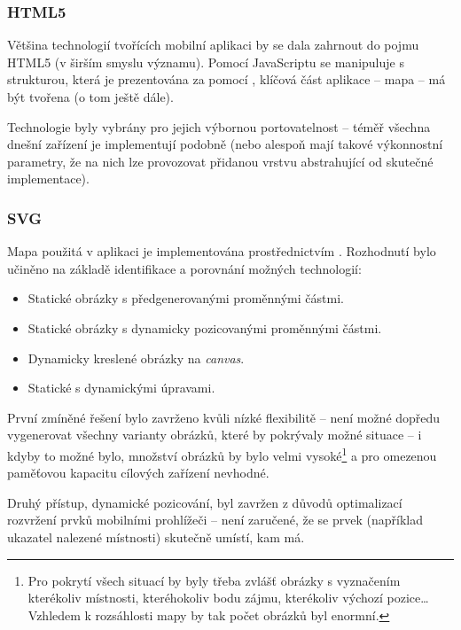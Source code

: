 \subsubsection{HTML5}
Většina technologií tvořících mobilní aplikaci by se dala zahrnout do pojmu HTML5 (v širším smyslu významu). Pomocí JavaScriptu se manipuluje s  strukturou, která je prezentována za pomocí , klíčová část aplikace -- mapa -- má být tvořena  (o tom ještě dále).

Technologie byly vybrány pro jejich výbornou portovatelnost -- téměř všechna dnešní zařízení je implementují podobně (nebo alespoň mají takové výkonnostní parametry, že na nich lze provozovat přidanou vrstvu abstrahující od skutečné implementace).

\subsubsection{SVG}
Mapa použitá v aplikaci je implementována prostřednictvím . Rozhodnutí bylo učiněno na základě identifikace a porovnání možných technologií:
\begin{itemize}
 \item Statické obrázky s předgenerovanými proměnnými částmi.
 \item Statické obrázky s dynamicky pozicovanými proměnnými částmi.
 \item Dynamicky kreslené obrázky na \textit{canvas}.
 \item Statické  s dynamickými úpravami.
\end{itemize}

První zmíněné řešení bylo zavrženo kvůli nízké flexibilitě -- není možné dopředu vygenerovat všechny varianty obrázků, které by pokrývaly možné situace -- i kdyby to možné bylo, množství obrázků by bylo velmi vysoké\footnote{Pro pokrytí všech situací by byly třeba zvlášť obrázky s vyznačením kterékoliv místnosti, kteréhokoliv bodu zájmu, kterékoliv výchozí pozice\dots Vzhledem k rozsáhlosti mapy by tak počet obrázků byl enormní.} a pro omezenou paměťovou kapacitu cílových zařízení nevhodné.

Druhý přístup, dynamické pozicování, byl zavržen z důvodů optimalizací rozvržení prvků mobilními prohlížeči -- není zaručené, že se prvek (například ukazatel nalezené místnosti) skutečně umístí, kam má.

